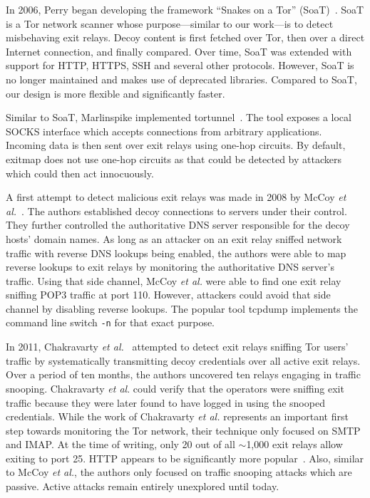 \documentclass[letterpaper,twocolumn,10pt]{article}
\begin{document}
In 2006, Perry began developing the framework ``Snakes on a Tor'' (\textsf{SoaT})~\cite{soat}.
\textsf{SoaT} is a Tor network scanner whose purpose---similar to our work---is to detect
misbehaving exit relays.  Decoy content is first fetched over Tor, then over a direct Internet
connection, and finally compared.  Over time, \textsf{SoaT} was extended with support for HTTP,
HTTPS, SSH and several other protocols.  However, \textsf{SoaT} is no longer maintained and makes
use of deprecated libraries.  Compared to \textsf{SoaT}, our design is more flexible and
significantly faster.

Similar to \textsf{SoaT}, Marlinspike implemented \textsf{tortunnel}~\cite{tortunnel}.  The tool
exposes a local SOCKS interface which accepts connections from arbitrary applications.  Incoming
data is then sent over exit relays using one-hop circuits.  By default, \textsf{exitmap} does not
use one-hop circuits as that could be detected by attackers which could then act innocuously.

A first attempt to detect malicious exit relays was made in 2008 by McCoy \emph{et
al.}~\cite{McCoy2008}.  The authors established decoy connections to servers under their control.
They further controlled the authoritative DNS server responsible for the decoy hosts' domain names.
As long as an attacker on an exit relay sniffed network traffic with reverse DNS lookups being
enabled, the authors were able to map reverse lookups to exit relays by monitoring the authoritative
DNS server's traffic.  Using that side channel, McCoy \emph{et al.} were able to find one exit relay
sniffing POP3 traffic at port 110.  However, attackers could avoid that side channel by disabling
reverse lookups.  The popular tool \textsf{tcpdump} implements the command line switch \texttt{-n}
for that exact purpose.

In 2011, Chakravarty \emph{et al.}~\cite{Chakravarty2011} attempted to detect exit relays sniffing
Tor users' traffic by systematically transmitting decoy credentials over all active exit relays.
Over a period of ten months, the authors uncovered ten relays engaging in traffic snooping.
Chakravarty \emph{et al}. could verify that the operators were sniffing exit traffic because they
were later found to have logged in using the snooped credentials.  While the work of Chakravarty
\emph{et al.} represents an important first step towards monitoring the Tor network, their technique
only focused on SMTP and IMAP.  At the time of writing, only 20 out of all $\sim$1,000 exit relays
allow exiting to port 25.  HTTP appears to be significantly more popular~\cite{McCoy2008,Huber2010}.
Also, similar to McCoy \emph{et al.}, the authors only focused on traffic snooping attacks which are
passive.  Active attacks remain entirely unexplored until today.
\end{document}
